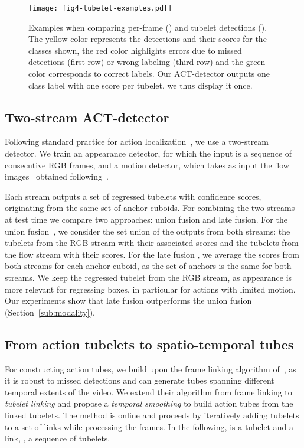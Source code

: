 \documentclass[10pt,twocolumn,letterpaper]{article}
\begin{document}
\begin{figure*}[t]
\centering
\texttt{[image: fig4-tubelet-examples.pdf]} 
\vspace{-0.5mm}
\caption{
Examples when comparing per-frame () and tubelet detections (). 
The yellow color represents the detections and their scores for the classes shown, the red color highlights errors due to missed detections (first row) or wrong labeling (third row) and the green color corresponds to correct labels. 
Our ACT-detector outputs one class label with one score per tubelet, we thus display it once.}
\vspace{-5.5mm}
\label{fig:tubelet}
\end{figure*}


\subsection{Two-stream ACT-detector}
\label{sub:video}

Following standard practice for action localization~\cite{Peng16eccv,Suman16bmvc,Weinzaepfel15iccv}, we use a two-stream detector. We train an appearance detector, for which the input is a sequence of  consecutive RGB frames, and a motion detector, which takes as input the flow images~\cite{brox04eccv} obtained following~\cite{Gkioxari15cvpr}. 

Each stream outputs a set of regressed tubelets with confidence scores, originating from the same set of anchor cuboids. For combining the two streams at test time we compare two approaches: union fusion and late fusion. For the union fusion~\cite{singh16arxiv}, we consider the set union of the outputs from both streams: the tubelets from the RGB stream with their associated scores and the tubelets from the flow stream with their scores. For the late fusion \cite{feichtenhofer16cvpr}, we average the scores from both streams for each anchor cuboid, as the set of anchors is the same for both streams. We keep the regressed tubelet from the RGB stream, as appearance is more relevant for regressing boxes, in particular for actions with limited motion.  Our experiments show that late fusion outperforms the union fusion (Section~\ref{sub:modality}).  

\subsection{From action tubelets to spatio-temporal tubes}
\label{sub:tubes}

For constructing action tubes, we build upon the frame linking algorithm of~\cite{singh16arxiv}, as it is robust to missed detections and can generate tubes spanning different temporal extents of the video. 
We extend their algorithm from frame linking to \textit{tubelet linking} and propose a \textit{temporal smoothing} to build action tubes from the linked tubelets. The method is online and proceeds by iteratively adding tubelets to a set of links while processing the frames. In the following,  is a tubelet and  a link, \ie, a sequence of tubelets.
\end{document}
